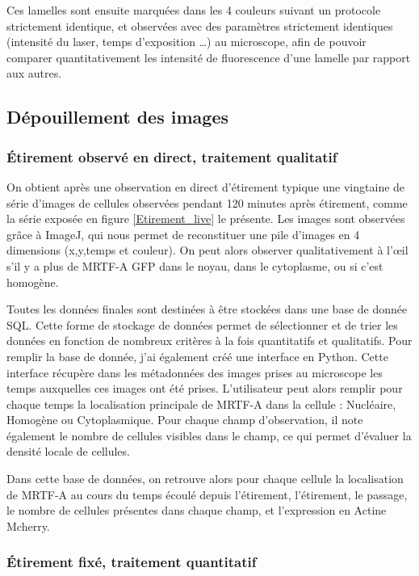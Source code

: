 \documentclass{report}
\begin{document}
	Ces lamelles sont ensuite marquées dans les 4 couleurs suivant un protocole strictement identique, et observées avec des paramètres strictement identiques (intensité du laser, temps d'exposition \dots) au microscope, afin de pouvoir comparer quantitativement les intensité de fluorescence d'une lamelle par rapport aux autres. 
	

	\subsection{Dépouillement des images}
	\subsubsection{\'Etirement observé en direct, traitement qualitatif}
	On obtient après une observation en direct d'étirement typique une vingtaine de série d'images de cellules observées pendant 120 minutes après étirement, comme la série exposée en figure \ref{Etirement_live} le présente.
	Les images sont observées grâce à ImageJ, qui nous permet de reconstituer une pile d'images en 4 dimensions (x,y,temps et couleur). On peut alors observer qualitativement à l'\oe il s'il y a plus de MRTF-A GFP dans le noyau, dans le cytoplasme, ou si c'est homogène. 
	
	Toutes les données finales sont destinées à être stockées dans une base de donnée SQL. Cette forme de stockage de données permet de sélectionner et de trier les données en fonction de nombreux critères à la fois quantitatifs et qualitatifs. Pour remplir la base de donnée, j'ai également créé une interface en Python. Cette interface récupère dans les métadonnées des images prises au microscope les temps auxquelles ces images ont été prises. L'utilisateur peut alors remplir pour chaque temps la localisation principale de MRTF-A dans la cellule : Nucléaire, Homogène ou Cytoplasmique. 
	Pour chaque champ d'observation, il note également le nombre de cellules visibles dans le champ, ce qui permet d'évaluer la densité locale de cellules. 
	
	Dans cette base de données, on retrouve alors pour chaque cellule la localisation de MRTF-A au cours du temps écoulé depuis l'étirement, l'étirement, le passage, le nombre de cellules présentes dans chaque champ, et l'expression en Actine Mcherry.
	\subsubsection{\'Etirement fixé, traitement quantitatif}	
	
\end{document}
